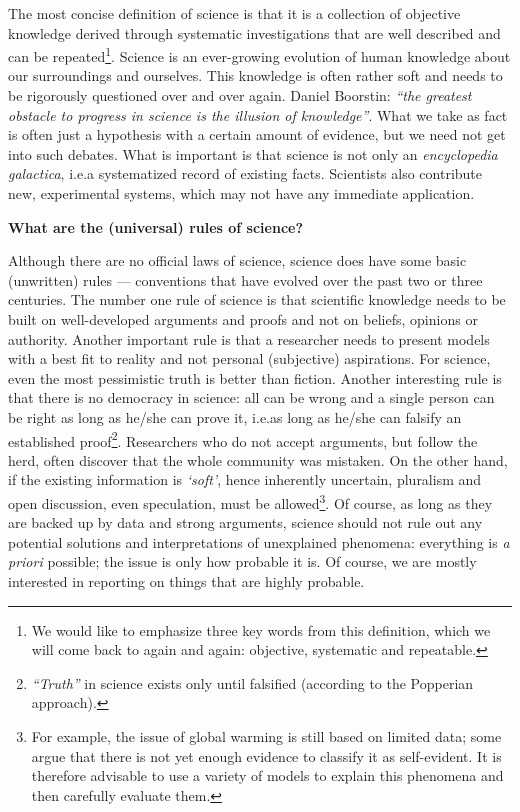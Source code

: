 \documentclass[graybox,envcountchap,sectrefs,UStrade]{svmono}
\begin{document}
\noindent The most concise definition of science is that it is a collection of objective knowledge derived through systematic investigations that are well described and can be repeated\footnote{We would like to emphasize three key words from this definition, which we will come back to again and again: objective, systematic and repeatable.}. Science is an ever-growing evolution of human knowledge about our surroundings and ourselves. This knowledge is often rather soft and needs to be rigorously questioned over and over again. Daniel Boorstin: \emph{``the greatest obstacle to progress in science is the illusion of knowledge''}. What we take as fact is often just a hypothesis with a certain amount of evidence, but we need not get into such debates. What is important is that science is not only an \emph{encyclopedia galactica}, i.e.\@ a systematized record of existing facts. Scientists also contribute new, experimental systems, which may not have any immediate application.\par

\begin{flushleft}
\textbf{What are the (universal) rules of science?}
\end{flushleft}

\noindent Although there are no official laws of science, science does have some basic (unwritten) rules --- conventions that have evolved over the past two or three centuries. The number one rule of science is that scientific knowledge needs to be built on well-developed arguments and proofs and not on beliefs, opinions or authority. Another important rule is that a researcher needs to present models with a best fit to reality and not personal (subjective) aspirations. For science, even the most pessimistic truth is better than fiction. Another interesting rule is that there is no democracy in science: all can be wrong and a single person can be right as long as he/she can prove it, i.e.\@ as long as he/she can falsify an established proof\footnote{\emph{``Truth''} in science exists only until falsified (according to the Popperian approach).}. Researchers who do not accept arguments, but follow the herd, often discover that the whole community was mistaken. On the other hand, if the existing information is \emph{`soft'}, hence inherently uncertain, pluralism and open discussion, even speculation, must be allowed\footnote{For example, the issue of global warming is still based on limited data; some argue that there is not yet enough evidence to classify it as self-evident. It is therefore advisable to use a variety of models to explain this phenomena and then carefully evaluate them.}. Of course, as long as they are backed up by data and strong arguments, science should not rule out any potential solutions and interpretations of unexplained phenomena: everything is \emph{a priori} possible; the issue is only how probable it is. Of course, we are mostly interested in reporting on things that are highly probable.\par
\end{document}
